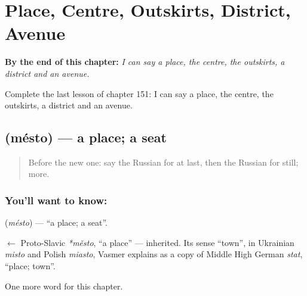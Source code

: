 
\chapter{Place, Centre, Outskirts, District, Avenue}
\label{ch:ru-place-centre-outskirts-district-avenue}

\begin{chapteropening}
\textbf{By the end of this chapter:} \emph{I can say a place, the centre, the outskirts, a district and an avenue.}

Complete the last lesson of chapter 151: I can say a place, the centre, the outskirts, a district and an avenue.
\end{chapteropening}

\section[\texorpdfstring{\ru{место} (mésto)}{место (mésto)}]{ (mésto) — a place; a seat}

\label{lesson:RU-C151-mesto}



\begin{quote}
Before the new one: say the Russian for at last, then the Russian for still; more.
\end{quote}

\subsection*{You'll want to know: }
\textbf{} (\emph{mésto}) — \textquotedblleft{}a place; a seat\textquotedblright{}.

\begin{cousinweb}
\textbf{} $\leftarrow$ Proto-Slavic \emph{*město}, \textquotedblleft{}a place\textquotedblright{} — inherited. Its sense \textquotedblleft{}town\textquotedblright{}, in Ukrainian \emph{misto} and Polish \emph{miasto}, Vasmer explains as a copy of Middle High German \emph{stat}, \textquotedblleft{}place; town\textquotedblright{}.
\end{cousinweb}

\begin{grammarlens}[title={What you've built}]
One more word for this chapter.
\end{grammarlens}

